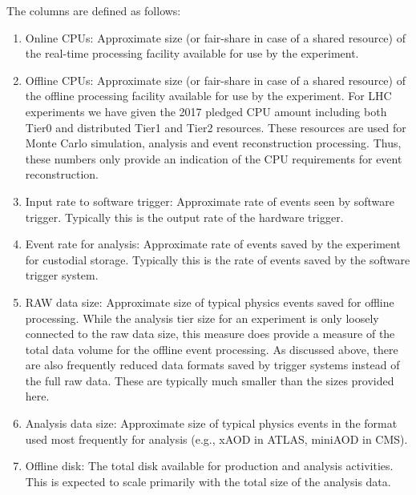The columns are defined as follows:
\begin{enumerate}
\item Online CPUs: Approximate size (or fair-share in case of a shared resource) of the real-time processing facility available for use by the experiment.
\item Offline CPUs: Approximate size (or fair-share in case of a shared resource) of the offline processing facility available for use by the experiment. For LHC experiments we have given the 
2017 pledged CPU amount including both Tier0 and distributed Tier1 and Tier2 resources. These resources are used for Monte Carlo simulation, analysis and event reconstruction processing. 
Thus, these numbers only provide an indication of the CPU requirements for event reconstruction.
\item Input rate to software trigger: Approximate rate of events seen by software trigger. Typically this is the output rate of the hardware trigger.
\item Event rate for analysis: Approximate rate of events saved by the experiment for custodial storage. Typically this is the rate of events saved by the software trigger system.
\item RAW data size: Approximate size of typical physics events saved for offline processing. While the analysis tier size for an experiment is only loosely connected to the raw data size, 
this measure does provide a measure of the total data volume for the offline event processing. As discussed above, there are also frequently reduced data formats saved by trigger systems 
instead of the full raw data. These are typically much smaller than the sizes provided here.
\item Analysis data size: Approximate size of typical physics events in the format used most frequently for analysis (e.g., xAOD in ATLAS, miniAOD in CMS).
\item Offline disk: The total disk available for production and analysis activities. This is expected to scale primarily with the total size of the analysis data.
\end{enumerate}

